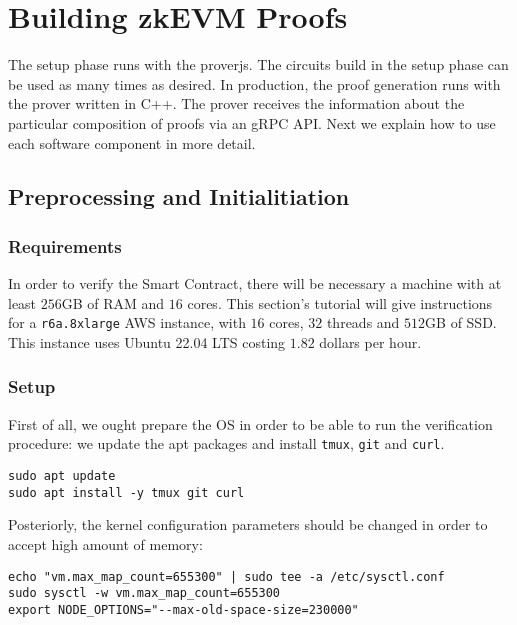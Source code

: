 
\section{Building zkEVM Proofs}

The setup phase runs with the proverjs. 
The circuits build in the setup phase can be used as many times
as desired.
In production, the proof generation runs with the prover written in C++.
The prover receives the information about the particular composition of 
proofs via an gRPC API.
Next we explain how to use each software component in more detail.

\subsection{Preprocessing and Initialitiation}


\subsubsection{Requirements}

In order to verify the Smart Contract, there will be necessary a machine with at least $256$GB of RAM and $16$ cores. This section's tutorial will give instructions for a \texttt{r6a.8xlarge} AWS instance, with $16$ cores, $32$ threads and $512$GB of SSD. This instance uses Ubuntu 22.04 LTS costing $1.82$ dollars per hour. 


\subsubsection{Setup}

First of all, we ought prepare the OS in order to be able to run the verification procedure: we update the apt packages and install \texttt{tmux}, \texttt{git} and \texttt{curl}.

\begin{lstlisting}[style=termt]
sudo apt update
sudo apt install -y tmux git curl
\end{lstlisting}

Posteriorly, the kernel configuration parameters should be changed in order to accept high amount of memory:

\begin{lstlisting}[style=termt]
echo "vm.max_map_count=655300" | sudo tee -a /etc/sysctl.conf
sudo sysctl -w vm.max_map_count=655300
export NODE_OPTIONS="--max-old-space-size=230000"
\end{lstlisting}

